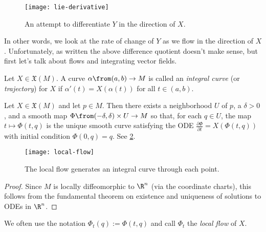 \begin{figure}[htbp]
	\centering
		\texttt{[image: lie-derivative]}
	\caption{An attempt to differentiate $Y$ in the direction of $X$.}
	\label{fig:lie-derivative}
\end{figure}

In other words, we look at the rate of change of $Y$ as we flow in the direction of $X$. Unfortunately, as written the above difference quotient doesn't make sense, but first let's talk about flows and integrating vector fields.

\begin{definition}\label{def:integral curve}
	Let $X \in \mathfrak{X}(M)$. A curve $\alpha\from (a,b) \to M$ is called an \emph{integral curve} (or \emph{trajectory}) for $X$ if $\alpha'(t) = X(\alpha(t))$ for all $t \in (a,b)$. 
\end{definition}

\begin{proposition}\label{prop:local flow}
	Let $X \in \mathfrak{X}(M)$ and let $p \in M$. Then there exists a neighborhood $U$ of $p$, a $\delta > 0$, and a smooth map $\Phi\from (-\delta, \delta) \times U \to M$ so that, for each $q \in U$, the map $t \mapsto \Phi(t,q)$ is the unique smooth curve satisfying the ODE $\frac{\partial \Phi}{\partial t} = X(\Phi(t,q))$ with initial condition $\Phi(0,q) = q$. See \cref{fig:local-flow}.
\end{proposition}

\begin{figure}[htbp]
	\centering
		\texttt{[image: local-flow]}
	\caption{The local flow generates an integral curve through each point.}
	\label{fig:local-flow}
\end{figure}

\begin{proof}
	Since $M$ is locally diffeomorphic to $\R^n$ (via the coordinate charts), this follows from the fundamental theorem on existence and uniqueness of solutions to ODEs in $\R^n$.
\end{proof}

We often use the notation $\Phi_t(q):=\Phi(t,q)$ and call $\Phi_t$ the \emph{local flow} of $X$.

